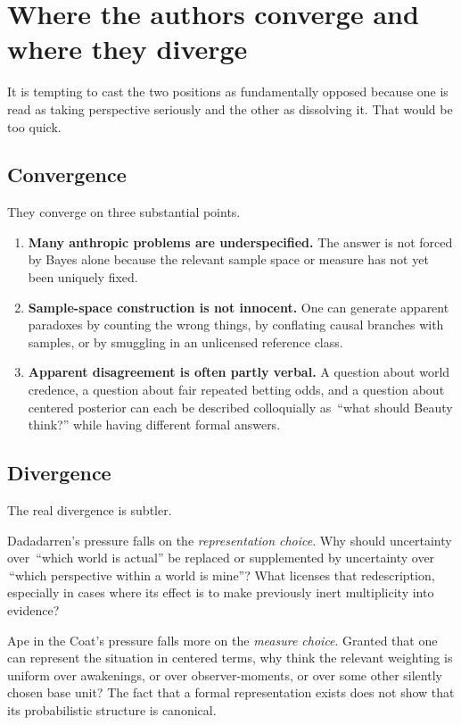 \documentclass[11pt]{article}
\newcommand{\1}{\mathbf{1}}
\begin{document}
\section{Where the authors converge and where they diverge}

It is tempting to cast the two positions as fundamentally opposed because one is read as taking perspective seriously and the other as dissolving it. That would be too quick.

\subsection{Convergence}

They converge on three substantial points.

\begin{enumerate}[label=(\alph*)]
  \item \textbf{Many anthropic problems are underspecified.} The answer is not forced by Bayes alone because the relevant sample space or measure has not yet been uniquely fixed.
  \item \textbf{Sample-space construction is not innocent.} One can generate apparent paradoxes by counting the wrong things, by conflating causal branches with samples, or by smuggling in an unlicensed reference class.
  \item \textbf{Apparent disagreement is often partly verbal.} A question about world credence, a question about fair repeated betting odds, and a question about centered posterior can each be described colloquially as \,``what should Beauty think?'' while having different formal answers.
\end{enumerate}

\subsection{Divergence}

The real divergence is subtler.

Dadadarren's pressure falls on the \emph{representation choice}. Why should uncertainty over \,``which world is actual'' be replaced or supplemented by uncertainty over \,``which perspective within a world is mine''? What licenses that redescription, especially in cases where its effect is to make previously inert multiplicity into evidence?

Ape in the Coat's pressure falls more on the \emph{measure choice}. Granted that one can represent the situation in centered terms, why think the relevant weighting is uniform over awakenings, or over observer-moments, or over some other silently chosen base unit? The fact that a formal representation exists does not show that its probabilistic structure is canonical.
\end{document}
